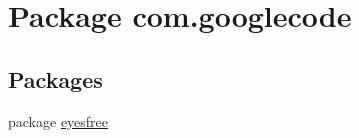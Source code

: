 \hypertarget{namespacecom_1_1googlecode}{\section{Package com.\-googlecode}
\label{namespacecom_1_1googlecode}
}
\subsection*{Packages}
\begin{DoxyCompactItemize}
\item 
package \hyperlink{namespacecom_1_1googlecode_1_1eyesfree}{eyesfree}
\end{DoxyCompactItemize}
